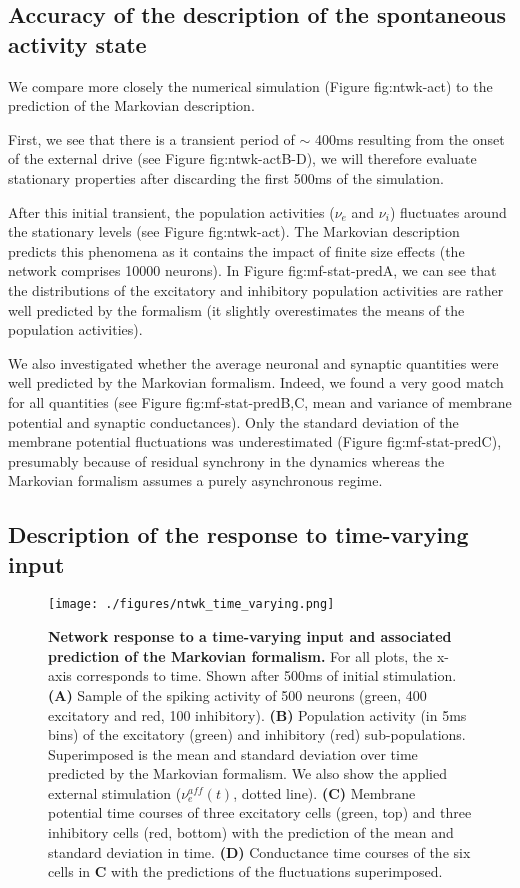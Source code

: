 \documentclass[8pt, colorlinks, a4paper]{article}
\renewcommand\ref{}
\begin{document}
\subsection{Accuracy of the description of the spontaneous activity state}
\label{sec-4-5}

We compare more closely the numerical simulation (Figure
\ref{fig:ntwk-act}) to the prediction of the Markovian description.

First, we see that there is a transient period of \(\sim\) 400ms
resulting from the onset of the external drive (see Figure
\ref{fig:ntwk-act}B-D), we will therefore evaluate stationary properties
after discarding the first 500ms of the simulation.

After this initial transient, the population activities (\(\nu_e\) and
\(\nu_i\)) fluctuates around the stationary levels (see Figure
\ref{fig:ntwk-act}). The Markovian description predicts this phenomena as it
contains the impact of finite size effects (the network comprises
10000 neurons). In Figure \ref{fig:mf-stat-pred}A, we can see that the
distributions of the excitatory and inhibitory population activities
are rather well predicted by the formalism (it slightly overestimates
the means of the population activities).

We also investigated whether the average neuronal and synaptic
quantities were well predicted by the Markovian formalism. Indeed, we
found a very good match for all quantities (see Figure
\ref{fig:mf-stat-pred}B,C, mean and variance of membrane potential and
synaptic conductances). Only the standard deviation of the membrane
potential fluctuations was underestimated (Figure \ref{fig:mf-stat-pred}C),
presumably because of residual synchrony in the dynamics whereas the
Markovian formalism assumes a purely asynchronous regime.

\subsection{Description of the response to time-varying input}
\label{sec-4-6}

\begin{figure}[tb!]
\centering
\texttt{[image: ./figures/ntwk\_time\_varying.png]}
\caption{\label{fig:mf-temp-pred}\textbf{Network response to a time-varying input and associated prediction of the Markovian formalism.} For all plots, the x-axis corresponds to time. Shown after 500ms of initial stimulation. \textbf{(A)} Sample of the spiking activity of 500 neurons (green, 400 excitatory and red, 100 inhibitory). \textbf{(B)} Population activity (in 5ms bins) of the excitatory (green) and inhibitory (red) sub-populations. Superimposed is the mean and standard deviation over time predicted by the Markovian formalism. We also show the applied external stimulation (\(\nu_e^{aff}(t)\), dotted line). \textbf{(C)} Membrane potential time courses of three excitatory cells (green, top) and three inhibitory cells (red, bottom) with the prediction of the mean and standard deviation in time. \textbf{(D)} Conductance time courses of the six cells in \textbf{C} with the predictions of the fluctuations superimposed.}
\end{figure}
\end{document}
